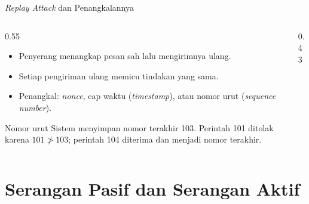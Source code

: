 \documentclass[aspectratio=169,11pt]{beamer}
\begin{document}
\begin{frame}{\textit{Replay Attack} dan Penangkalannya}
    \begin{columns}[T,onlytextwidth]
        \begin{column}{0.55\textwidth}
            \begin{itemize}
                \item Penyerang menangkap pesan sah lalu mengirimnya ulang.
                \item Setiap pengiriman ulang memicu tindakan yang sama.
                \item Penangkal: \textit{nonce}, cap waktu
                      (\textit{timestamp}), atau nomor urut
                      (\textit{sequence number}).
            \end{itemize}
            \begin{exampleblock}{Nomor urut}
                \footnotesize
                Sistem menyimpan nomor terakhir 103. Perintah 101 ditolak
                karena $101\not>103$; perintah 104 diterima dan menjadi nomor
                terakhir.
            \end{exampleblock}
        \end{column}
        \begin{column}{0.43\textwidth}
            \centering
        \end{column}
    \end{columns}
\end{frame}

\section{Serangan Pasif dan Serangan Aktif}
\end{document}
